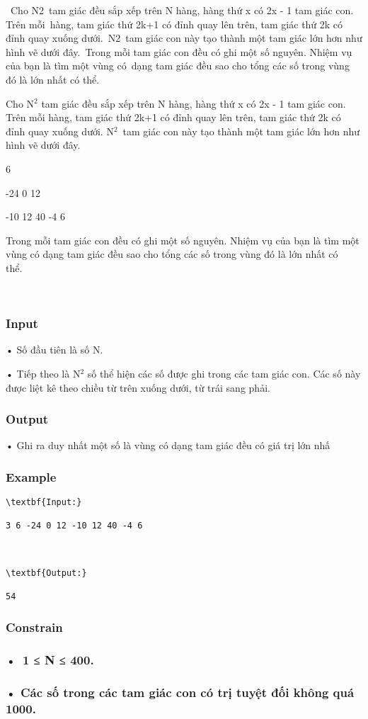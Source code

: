 

 Cho N2 tam giác đều sắp xếp trên N hàng, hàng thứ x có 2x - 1 tam giác con. Trên mỗi hàng, tam giác thứ 2k+1 có đỉnh quay lên trên, tam giác thứ 2k có đỉnh quay xuống dưới. N2 tam giác con này tạo thành một tam giác lớn hơn như hình vẽ dưới đây. Trong mỗi tam giác con đều có ghi một số nguyên. Nhiệm vụ của bạn là tìm một vùng có dạng tam giác đều sao cho tổng các số trong vùng đó là lớn nhất có thể. 

Cho N$^2$ tam giác đều sắp xếp trên N hàng, hàng thứ x có 2x - 1 tam giác con. Trên mỗi hàng, tam giác thứ 2k+1 có đỉnh quay lên trên, tam giác thứ 2k có đỉnh quay xuống dưới. N$^2$ tam giác con này tạo thành một tam giác lớn hơn như hình vẽ dưới đây. 

6

-24 0 12

-10 12 40 -4 6

Trong mỗi tam giác con đều có ghi một số nguyên. Nhiệm vụ của bạn là tìm một vùng có dạng tam giác đều sao cho tổng các số trong vùng đó là lớn nhất có thể. 

 

\subsubsection{Input}

• Số đầu tiên là số N. 

• Tiếp theo là N$^2$ số thể hiện các số được ghi trong các tam giác con. Các số này được liệt kê theo chiều từ trên xuống dưới, từ trái sang phải. 

\subsubsection{Output}

• Ghi ra duy nhất một số là vùng có dạng tam giác đều có giá trị lớn nhấ

\subsubsection{Example}
\begin{verbatim}
\textbf{Input:}

3 6 -24 0 12 -10 12 40 -4 6



\textbf{Output:}

54\end{verbatim}

\subsubsection{Constrain}

\subsubsection{• 1 ≤ N ≤ 400.}

\subsubsection{• Các số trong các tam giác con có trị tuyệt đối không quá 1000. }